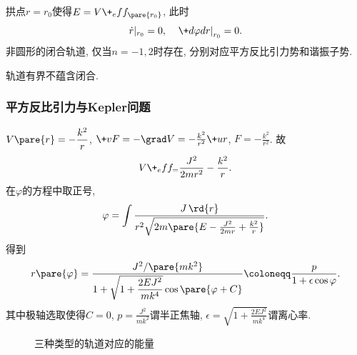 \documentclass[../LectureNotes.tex]{subfiles}
\begin{document}

拱点$r=r_0$使得$E = V\+_eff_\pare{r_0}$, 此时
\[ \dot{r}\vert_{r_0} = 0,\quad \left.\+d\varphi dr\right\vert_{r_0} = 0. \]
非圆形的闭合轨道, 仅当$n=-1, 2$时存在, 分别对应平方反比引力势和谐振子势.
\begin{remark}
    轨道有界不蕴含闭合.
\end{remark}


\subsubsection{平方反比引力与Kepler问题} %
\label{ssub:平方反比引力与kepler问题}

$\displaystyle V\pare{r} = -\frac{k^2}{r}$, $\+vF = -\grad V = -\frac{k^2}{r^2}\+ur$, $F = -\frac{k^2}{r^2}$. 故
\[ V\+_eff_ = \frac{J^2}{2mr^2} - \frac{k^2}{r}. \]
在$\varphi$的方程中取正号,
\[ \varphi = \int \frac{J\,\rd{r}}{r^2\sqrt{2m\pare{E - \frac{J^2}{2mr} + \frac{k^2}{r}}}}. \]
得到
\[ r\pare{\varphi} = \frac{J^2/\pare{mk^2}}{1+\sqrt{1+\displaystyle \frac{2EJ^2}{mk^4}}\cos\pare{\varphi + C}} \coloneqq \frac{p}{1+\epsilon \cos\varphi}. \]
其中极轴选取使得$C=0$, $p = \displaystyle\frac{J^2}{mk^2}$谓半正焦轴, $\epsilon = \displaystyle \sqrt{1+\frac{2EJ^2}{mk^4}}$谓离心率.
\begin{figure}[ht]
    \centering
    \begin{subfigure}{2.5cm}
        \centering
        \caption{}
        \label{fig:双曲线轨道}
    \end{subfigure}
    \hspace{1cm}
    \begin{subfigure}{2.5cm}
        \centering
        \caption{}
        \label{fig:抛物线轨道}
    \end{subfigure}
    \hspace{1cm}
    \begin{subfigure}{3.5cm}
        \centering
        \caption{}
        \label{fig:椭圆轨道}
    \end{subfigure}
    \caption{}
\end{figure}
\begin{figure}[ht]
    \centering
    \caption{三种类型的轨道对应的能量}
\end{figure}
\end{document}
